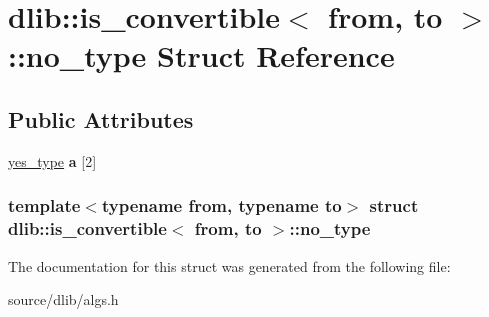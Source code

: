\hypertarget{structdlib_1_1is__convertible_1_1no__type}{
\section{dlib::is\_\-convertible$<$ from, to $>$::no\_\-type Struct Reference}
\label{structdlib_1_1is__convertible_1_1no__type}
}
\subsection*{Public Attributes}
\begin{DoxyCompactItemize}
\item 
\hypertarget{structdlib_1_1is__convertible_1_1no__type_a8cb9eb6bdb378eff2c1467069316443a}{
\hyperlink{structdlib_1_1is__convertible_1_1yes__type}{yes\_\-type} {\bfseries a} \mbox{[}2\mbox{]}}
\label{structdlib_1_1is__convertible_1_1no__type_a8cb9eb6bdb378eff2c1467069316443a}

\end{DoxyCompactItemize}
\subsubsection*{template$<$typename from, typename to$>$ struct dlib::is\_\-convertible$<$ from, to $>$::no\_\-type}



The documentation for this struct was generated from the following file:\begin{DoxyCompactItemize}
\item 
source/dlib/algs.h\end{DoxyCompactItemize}
